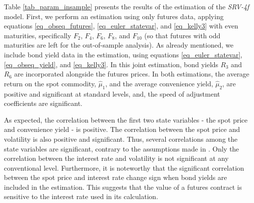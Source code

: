 \documentclass{article}
\begin{document}
Table \ref{tab_param_insample} presents the results of the estimation of the \textit{SRV-4f} model. First, we perform an estimation using only futures data, applying equations \eqref{eq_obseq_futures}, \eqref{eq_euler_statevar}, and \eqref{eq_kelly3} with even maturities, specifically \(F_2\), \(F_4\), \(F_6\), \(F_8\), and \(F_{10}\) (so that futures with odd maturities are left for the out-of-sample analysis). As already mentioned, we include bond yield data in the estimation, using equations \eqref{eq_euler_statevar}, \eqref{eq_obseq_yield}, and \eqref{eq_kelly3}. In this joint estimation, bond yields \(R_3\) and \(R_6\) are incorporated alongside the futures prices. In both estimations, the average return on the spot commodity, \(\widehat{\mu}_1\), and the average convenience yield, \(\widehat{\mu}_2\), are positive and significant at standard levels, and, the speed of adjustment coefficients are significant. 


As expected, the correlation between the first two state variables - the spot price and convenience yield - is positive. The correlation between the spot price and volatility is also positive and significant. Thus, several correlations among the state variables are significant, contrary to the assumptions made in \cite{yan02}. Only the correlation between the interest rate and volatility is not significant at any conventional level. Furthermore, it is noteworthy that the significant correlation between the spot price and interest rate change sign when bond yields are included in the estimation. This suggests that the value of a futures contract is sensitive to the interest rate used in its calculation.
\end{document}
